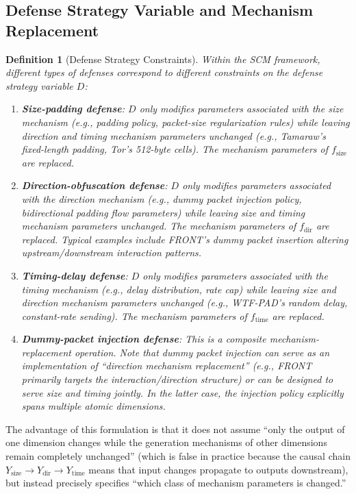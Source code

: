 \documentclass[lettersize,journal]{IEEEtran}
\newtheorem{definition}{Definition}
\begin{document}
\subsection{Defense Strategy Variable and Mechanism Replacement}

\begin{definition}[Defense Strategy Constraints]\label{def:defense-constraint}
Within the SCM framework, different types of defenses correspond to
different constraints on the defense strategy variable $D$:
\begin{enumerate}[label=(\roman*)]
\item \textbf{Size-padding defense}: $D$ only modifies parameters
  associated with the size mechanism (e.g., padding policy, packet-size
  regularization rules) while leaving direction and timing mechanism
  parameters unchanged (e.g., Tamaraw's fixed-length padding, Tor's
  512-byte cells). The mechanism parameters of $f_{\mathrm{size}}$ are
  replaced.

\item \textbf{Direction-obfuscation defense}: $D$ only modifies parameters
  associated with the direction mechanism (e.g., dummy packet injection
  policy, bidirectional padding flow parameters) while leaving size and
  timing mechanism parameters unchanged. The mechanism parameters of
  $f_{\mathrm{dir}}$ are replaced. Typical examples include FRONT's
  dummy packet insertion altering upstream/downstream interaction patterns.

\item \textbf{Timing-delay defense}: $D$ only modifies parameters
  associated with the timing mechanism (e.g., delay distribution, rate
  cap) while leaving size and direction mechanism parameters unchanged
  (e.g., WTF-PAD's random delay, constant-rate sending).
  The mechanism parameters of $f_{\mathrm{time}}$ are replaced.

\item \textbf{Dummy-packet injection defense}: This is a composite
  mechanism-replacement operation. Note that dummy packet injection can
  serve as an implementation of ``direction mechanism replacement''
  (e.g., FRONT primarily targets the interaction/direction structure) or
  can be designed to serve size and timing jointly. In the latter case,
  the injection policy explicitly spans multiple atomic dimensions.
\end{enumerate}
\end{definition}

The advantage of this formulation is that it does not assume ``only the
output of one dimension changes while the generation mechanisms of other
dimensions remain completely unchanged'' (which is false in practice
because the causal chain
$Y_{\mathrm{size}}\to Y_{\mathrm{dir}}\to Y_{\mathrm{time}}$
means that input changes propagate to outputs downstream), but instead
precisely specifies ``which class of mechanism parameters is changed.''
\end{document}

